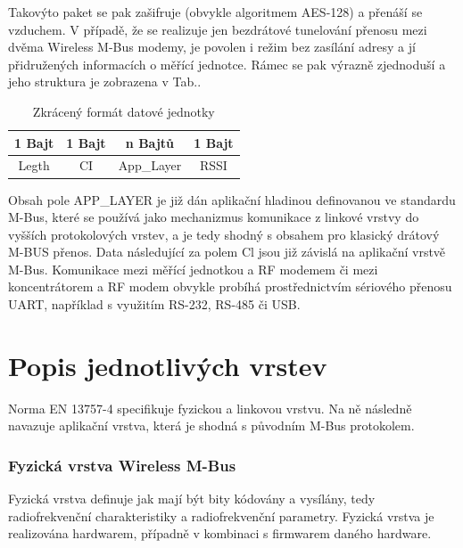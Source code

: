 Takovýto paket se pak zašifruje (obvykle algoritmem AES-128) a přenáší se vzduchem. V případě, že se realizuje jen bezdrátové tunelování přenosu mezi dvěma Wireless M-Bus modemy, je povolen i režim bez zasílání adresy a jí přidružených informacích o měřící jednotce. Rámec se pak výrazně zjednoduší a jeho struktura je zobrazena v Tab.\cite{PaketWm3}.

			
			\begin{table}[!h]
\centering
\begin{tabular}{cccc}
1 Bajt & 1 Bajt & n Bajtů & 1 Bajt \\ \hline
\multicolumn{1}{|c|}{Legth} & \multicolumn{1}{c|}{CI} & \multicolumn{1}{c|}{App\_Layer} & \multicolumn{1}{c|}{RSSI} \\ \hline
\end{tabular}
\caption{Zkrácený formát datové jednotky \cite{FormatDatoveJednotky}}
\label{PaketWm3}
\end{table}
			
Obsah pole APP\_LAYER je již dán aplikační hladinou definovanou ve standardu M-Bus, které se používá jako mechanizmus komunikace z linkové vrstvy do vyšších protokolových vrstev, a je tedy shodný s obsahem pro klasický drátový M-BUS přenos.  Data následující za polem Cl jsou již závislá na aplikační vrstvě M-Bus. Komunikace mezi měřící jednotkou a RF modemem či mezi koncentrátorem a RF modem obvykle probíhá prostřednictvím sériového přenosu UART, například s využitím RS-232, RS-485 či USB.




\newpage


\section{Popis jednotlivých vrstev}

Norma EN 13757-4 specifikuje fyzickou a linkovou vrstvu. Na ně následně navazuje aplikační vrstva, která je shodná s původním M-Bus protokolem.

\subsubsection{Fyzická vrstva Wireless M-Bus}
Fyzická vrstva definuje jak mají být bity kódovány a vysílány, tedy radiofrekvenční charakteristiky a radiofrekvenční parametry. Fyzická vrstva je realizována hardwarem, případně v kombinaci s firmwarem daného hardware.

